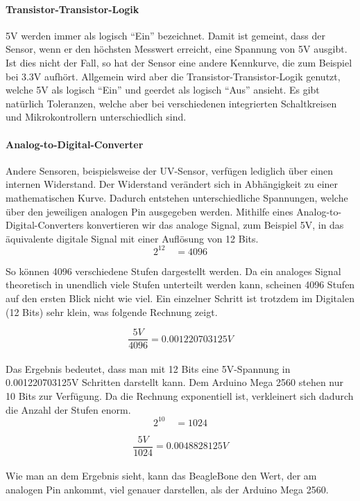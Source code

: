 \paragraph{Transistor-Transistor-Logik}
5V werden immer als logisch ``Ein'' bezeichnet. Damit ist gemeint, dass der Sensor, wenn er den höchsten Messwert erreicht, eine Spannung von 5V ausgibt. Ist dies nicht der Fall, so hat der Sensor eine andere Kennkurve, die zum Beispiel bei 3.3V aufhört. Allgemein wird aber die Transistor-Transistor-Logik genutzt, welche 5V als logisch ``Ein'' und geerdet als logisch ``Aus'' ansieht. Es gibt natürlich Toleranzen, welche aber bei verschiedenen integrierten Schaltkreisen und Mikrokontrollern unterschiedlich sind.

\paragraph{Analog-to-Digital-Converter}
Andere Sensoren, beispielsweise der UV-Sensor, verfügen lediglich über einen internen Widerstand. Der Widerstand verändert sich in Abhängigkeit zu einer mathematischen Kurve. Dadurch entstehen unterschiedliche Spannungen, welche über den jeweiligen analogen Pin ausgegeben werden. Mithilfe eines Analog-to-Digital-Converters konvertieren wir das analoge Signal, zum Beispiel 5V, in das äquivalente digitale Signal mit einer Auflösung von 12 Bits. \\

\[
2^{12} \quad = 4096
\]

So können 4096 verschiedene Stufen dargestellt werden. Da ein analoges Signal theoretisch in unendlich viele Stufen unterteilt werden kann, scheinen 4096 Stufen auf den ersten Blick nicht wie viel. Ein einzelner Schritt ist trotzdem im Digitalen (12 Bits) sehr klein, was folgende Rechnung zeigt.

\[
\frac{5V}{4096} = 0.001220703125 V
\] \\

Das Ergebnis bedeutet, dass man mit 12 Bits eine 5V-Spannung in 0.001220703125V Schritten darstellt kann. Dem Arduino Mega 2560 stehen nur 10 Bits zur Verfügung. Da die Rechnung exponentiell ist, verkleinert sich dadurch die Anzahl der Stufen enorm.\\

\[
2^{10} \quad = 1024
\]

\[
\frac{5V}{1024} = 0.0048828125V
\] \\

Wie man an dem Ergebnis sieht, kann das BeagleBone den Wert, der am analogen Pin ankommt, viel genauer darstellen, als der Arduino Mega 2560. 

